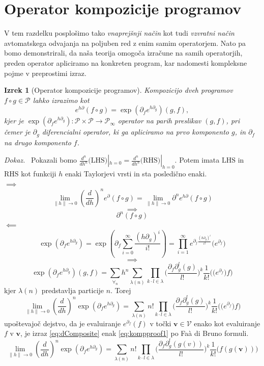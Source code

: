 \documentclass[a4paper, 12pt]{book}
\newcommand{\VV}{\mathcal{V}}
\newcommand{\vv}{\mathbf{v}}
\newcommand{\dP}{\mathcal{P}}
\newcommand{\D}{\partial}
\newtheorem{izrek}{Izrek}[chapter]
\newenvironment{dokaz}{\emph{Dokaz.}\ }{\hspace{\fill}{$\Box$}}
\begin{document}
\section{Operator kompozicije programov}\label{sec:OpKompo}

V tem razdelku posplošimo tako \emph{vnaprejšnji način} \cite{PcAD} kot tudi \emph{vzvratni način} \cite{ReverseAD} avtomatskega odvajanja na poljuben red z enim samim operatorjem. Nato pa bomo demonstrirali, da naša teorija omogoča izračune na samih operatorjih, preden operator apliciramo na konkreten program, kar nadomesti kompleksne pojme v preprostimi izraz.

 \begin{izrek}[Operator kompozicije programov]\label{izr:kompo}
 Kompozicijo dveh programov $f\circ g\in\dP$ lahko izrazimo kot
 \begin{equation}\label{eq:kompo}
 e^{h\D}(f\circ g)=\exp(\D_fe^{h\D_g})(g,f),
 \end{equation}
 kjer je $\exp(\D_fe^{h\D_g}):\dP\times\dP\to\dP_\infty$ operator na parih preslikav $(g,f)$, pri čemer je $\D_g$ diferencialni operator, ki ga apliciramo na prvo komponento $g$, in $\D_f$ na drugo komponento $f$. 
 \end{izrek}
\begin{dokaz}
  Pokazali bomo $\frac{d^n}{dh^n}\text{(LHS)}|_{h=0}=\frac{d^n}{dh^n}\text{(RHS)}|_{h=0}$. Potem imata $\text{LHS}$ in $\text{RHS}$ kot funkciji $h$ enaki Taylorjevi vrsti in sta posledično enaki.\\
 $\implies$
 $$\lim\limits_{\lVert h\rVert\to 0}(\frac{d}{dh})^ne^\D(f\circ g)=\lim\limits_{\lVert h\rVert\to 0}\D^ne^{h\D}(f\circ g)$$
 $$\implies$$
 \begin{equation}\label{eq:kompproof1}
 \D^n(f\circ g)
 \end{equation}
 $\impliedby$
 $$\exp(\D_fe^{h\D_g})=\exp\left(\D_f\sum\limits_{i=0}^{\infty}\frac{(h\D_g)^i}{i!}\right)=\prod_{i=1}^{\infty}e^{\D_f\frac{(h\D_g)^i}{i!}}\Big(e^{\D_f}\Big)$$
 $$\implies$$
 $$\exp(\D_fe^{h\D_g})(g,f)=\sum\limits_{\forall_n}h^n\sum\limits_{\lambda(n)}\prod\limits_{k\cdot l\in\lambda}\Big(\frac{\D_f\D_g^l(g)}{l!}\Big)^k\frac{1}{k!}\Big(\Big(e^{\D_f}\Big)f\Big)$$
 kjer $\lambda(n)$ predstavlja particije $n$. Torej
 \begin{equation}\label{eq:dComposite}
 \lim\limits_{\lVert h\rVert\to 0}(\frac{d}{dh})^n\exp(\D_fe^{h\D_g})=\sum\limits_{\lambda(n)}n!\prod\limits_{k\cdot l\in\lambda}\Big(\frac{\D_f\D_g^l(g)}{l!}\Big)^k\frac{1}{k!}\Big(\Big(e^{\D_f}\Big)f\Big)
 \end{equation}
 upoštevajoč dejstvo, da je evaluiranje $e^{\D_f}(f)$ v točki $\vv\in \VV$ enako kot evaluiranje $f$ v $\vv$, je izraz \eqref{eq:dComposite} enak \eqref{eq:kompproof1} po Faà di Bruno formuli.
   \begin{equation}\label{eq:dCompositePoint}
   \lim\limits_{\lVert h\rVert\to 0}(\frac{d}{dh})^n\exp(\D_fe^{h\D_g})=\sum\limits_{\lambda(n)}n!\prod\limits_{k\cdot l\in\lambda}\Big(\frac{\D_f\D_g^l(g(v))}{l!}\Big)^k\frac{1}{k!}\Big(f(g(\vv))\Big)
   \end{equation}
 \end{dokaz}  
 
\end{document}
